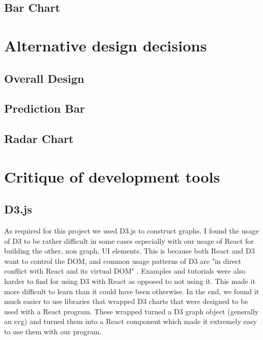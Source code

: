 \documentclass[10pt, journal]{IEEEtran}
\begin{document}
\subsection{Bar Chart}

\section{Alternative design decisions} 

\subsection{Overall Design}

\subsection{Prediction Bar}

\subsection{Radar Chart}


\section{Critique of development tools}
\subsection{D3.js}
As required for this project we used D3.js\cite{d3} to construct graphs. I found the usage of D3 to be rather difficult in some cases especially with our usage of React for building the other, non graph, UI elements. This is because both React and D3 want to control the DOM, and common usage patterns of D3 are "in direct conflict with React and its virtual DOM" \cite{meeks}. Examples and tutorials were also harder to find for using D3 with React as opposed to not using it. This made it more difficult to learn than it could have been otherwise. In the end, we found it much easier to use libraries that wrapped D3 charts that were designed to be used with a React program. These wrapped turned a D3 graph object (generally an svg) and turned them into a React component which made it extremely easy to use them with our program.
\end{document}

